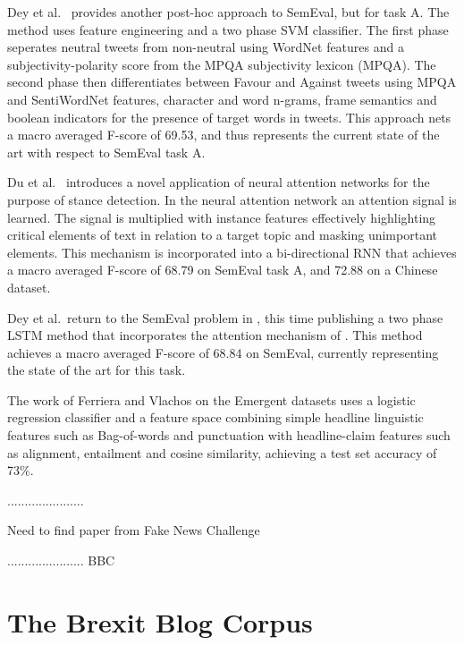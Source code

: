 \documentclass[Dissertation.tex]{subfiles}
\begin{document}
Dey et al.\ \cite{deyTwitterStanceDetection2017} provides another post-hoc approach to SemEval, but for task A. The method uses feature engineering and a two phase SVM classifier. The first phase seperates neutral tweets from non-neutral using WordNet \cite{WordNetLexicalDatabase} features and a subjectivity-polarity score from the MPQA subjectivity lexicon \cite{SubjectivityLexiconMPQA} (MPQA). The second phase then differentiates between Favour and Against tweets using MPQA and SentiWordNet \cite{SentiWordNet} features, character and word n-grams, frame semantics and boolean indicators for the presence of target words in tweets. This approach nets a macro averaged F-score of 69.53, and thus represents the current state of the art with respect to SemEval task A.

Du et al.\ \cite{duStanceClassificationTargetspecific} introduces a novel application of neural attention networks for the purpose of stance detection. In the neural attention network an attention signal is learned. The signal is multiplied with instance features effectively highlighting critical elements of text in relation to a target topic and masking unimportant elements. This mechanism is incorporated into a bi-directional RNN that achieves a macro averaged F-score of 68.79 on SemEval task A, and 72.88 on a Chinese dataset.

Dey et al.\ return to the SemEval problem in \cite{deyTopicalStanceDetection2018}, this time publishing a two phase LSTM method that incorporates the attention mechanism of \cite{duStanceClassificationTargetspecific}. This method achieves a macro averaged F-score of 68.84 on SemEval, currently representing the state of the art for this task.


The work of Ferriera and Vlachos \cite{ferreiraEmergentNovelDataset2016} on the Emergent datasets uses a logistic regression classifier and a feature space combining simple headline linguistic features such as Bag-of-words and punctuation with headline-claim features such as alignment, entailment and cosine similarity, achieving a test set accuracy of 73\%.


......................

Need to find paper from Fake News Challenge

......................
BBC\section{The Brexit Blog Corpus}\label{BBC}
\end{document}
